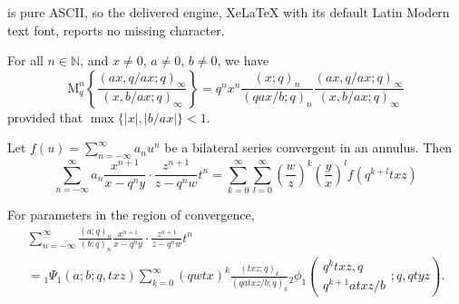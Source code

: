 \documentclass[10pt,a4paper]{amsart}
\newcommand{\M}{\mathrm{M}}
\newcommand{\N}{\mathbb{N}}
\begin{document}
is pure ASCII, so the delivered engine, XeLaTeX with its default Latin Modern text font, reports no missing character.
\begin{lemma}\label{lemma2}
For all $n\in\N$, and $x\neq0$, $a\neq0$, $b\neq0$, we have
    \begin{equation}
        \M_{q}^n\left\{\frac{(ax,q/ax;q)_{\infty}}{(x,b/ax;q)_{\infty}}\right\}=q^nx^n\frac{(x;q)_{n}}{(qax/b;q)_{n}}\frac{(ax,q/ax;q)_{\infty}}{(x,b/ax;q)_{\infty}}
    \end{equation}
provided that $\max\{\vert x\vert,\vert b/ax\vert\}<1$.    
\end{lemma}

\begin{theorem}\label{bimehler}
Let $f(u) = \sum_{n=-\infty}^{\infty}a_nu^n$ be a bilateral series convergent in an annulus. Then
    \begin{equation}
        \sum_{n=-\infty}^{\infty}a_{n}\frac{x^{n+1}}{x-q^ny}\cdot\frac{z^{n+1}}{z-q^nw}t^n=\sum_{k=0}^{\infty}\sum_{l=0}^{\infty}\left(\frac{w}{z}\right)^k\left(\frac{y}{x}\right)^lf(q^{k+l}txz)
    \end{equation}
\end{theorem}

\begin{corollary}\label{coroBLM}
For parameters in the region of convergence,
    \begin{multline}
        \sum_{n=-\infty}^{\infty}\frac{(a;q)_n}{(b;q)_n}\frac{x^{n+1}}{x-q^ny}\cdot\frac{z^{n+1}}{z-q^nw}t^n\\
        ={}_{1}\Psi_{1}(a;b;q,txz)\sum_{k=0}^{\infty}\left(qwtx\right)^k\frac{(txz;q)_k}{(qatxz/b;q)_k}{}_{2}\phi_{1}\left(
    \begin{array}{c}
         q^ktxz,q \\
         q^{k+1}atxz/b
    \end{array}
    ;q,qtyz
    \right).
    \end{multline}
\end{corollary}
\end{document}
